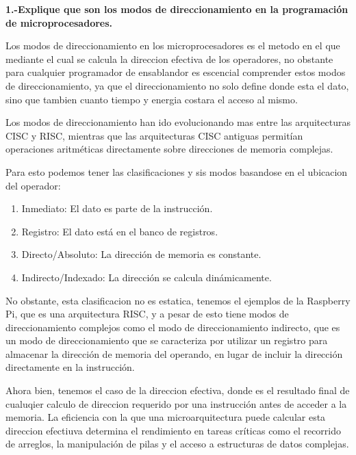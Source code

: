 \documentclass[letterpaper,12pt]{article}
\begin{document}
    

    \newpage
    \setcounter{page}{1} %

    \noindent\textbf{1.-Explique que son los modos de direccionamiento en la programación de microprocesadores. }

    Los modos de direccionamiento en los microprocesadores es el metodo en el que mediante el cual se calcula la direccion efectiva de los operadores, no obstante para cualquier programador de ensablandor es escencial comprender estos modos de direccionamiento, ya que el direccionamiento no solo define donde esta el dato, sino que tambien cuanto tiempo y energia costara el acceso al mismo.

    Los modos de direccionamiento han ido evolucionando mas entre las arquitecturas CISC y RISC, mientras que las arquitecturas CISC antiguas permitían operaciones aritméticas directamente sobre direcciones de memoria complejas.

    Para esto podemos tener las clasificaciones y sis modos basandose en el ubicacion del operador:

    \begin{enumerate}
        \item Inmediato: El dato es parte de la instrucción.
        \item Registro: El dato está en el banco de registros.
        \item Directo/Absoluto: La dirección de memoria es constante.
        \item Indirecto/Indexado: La dirección se calcula dinámicamente.
    \end{enumerate}

    No obstante, esta clasificacion no es estatica, tenemos el ejemplos de la Raspberry Pi, que es una arquitectura RISC, y a pesar de esto tiene modos de direccionamiento complejos como el modo de direccionamiento indirecto, que es un modo de direccionamiento que se caracteriza por utilizar un registro para almacenar la dirección de memoria del operando, en lugar de incluir la dirección directamente en la instrucción.

    Ahora bien, tenemos el caso de la direccion efectiva, donde es el resultado final de cualuqier calculo de direccion requerido  por una instrucción antes de acceder a la memoria.  La eficiencia con la que una microarquitectura puede calcular esta direccion efectiuva determina el rendimiento en tareas críticas como el recorrido de arreglos, la manipulación de pilas y el acceso a estructuras de datos complejas.
\end{document}
